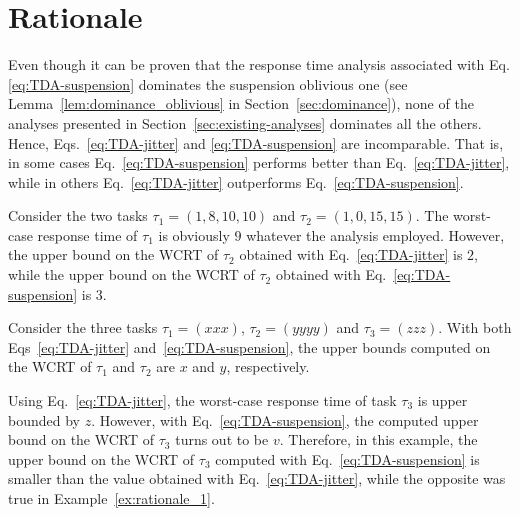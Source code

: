 \section{Rationale}
\label{sec:rationale}

Even though it can be proven that the response time analysis associated with Eq.\eqref{eq:TDA-suspension} dominates the suspension oblivious one (see Lemma~\ref{lem:dominance_oblivious} in Section~\ref{sec:dominance}), none of the analyses presented in Section~\ref{sec:existing-analyses} dominates all the others. Hence, Eqs.~\eqref{eq:TDA-jitter} and \eqref{eq:TDA-suspension} are incomparable. That is, in some cases Eq.~\eqref{eq:TDA-suspension} performs better than Eq.~\eqref{eq:TDA-jitter}, while in others Eq.~\eqref{eq:TDA-jitter} outperforms Eq.~\eqref{eq:TDA-suspension}.

\begin{example} 
\label{ex:rationale_1}  
Consider the two tasks $\tau_1 = (1, 8, 10, 10)$ and $\tau_2 = (1, 0, 15, 15)$. The worst-case response time of $\tau_1$ is obviously $9$ whatever the analysis employed. However, the upper bound on the WCRT of $\tau_2$ obtained with Eq.~\eqref{eq:TDA-jitter} is $2$, while 
the upper bound on the WCRT of $\tau_2$ obtained with Eq.~\eqref{eq:TDA-suspension} is $3$. %
\end{example}

\begin{example}   
Consider the three tasks $\tau_1 = (xxx)$, $\tau_2 = (yyyy)$ and $\tau_3 = (zzz)$. With both Eqs~\eqref{eq:TDA-jitter} and~\eqref{eq:TDA-suspension}, the upper bounds computed on the WCRT of $\tau_1$ and $\tau_2$ are $x$ and $y$, respectively. 

Using Eq.~\eqref{eq:TDA-jitter}, the worst-case response time of task $\tau_3$ is upper bounded by $z$. %
However, with Eq.~\eqref{eq:TDA-suspension}, the computed upper bound on the WCRT of $\tau_3$ turns out to be $v$. %
Therefore, in this example, the upper bound on the WCRT of $\tau_3$ computed with Eq.~\eqref{eq:TDA-suspension} is smaller than the value obtained with Eq.~\eqref{eq:TDA-jitter}, while the opposite was true in Example~\ref{ex:rationale_1}. 
\end{example}

